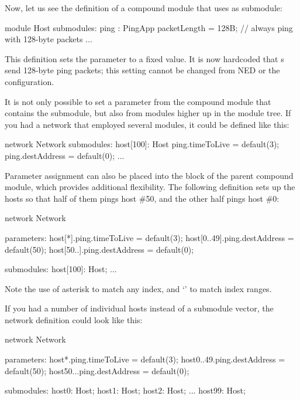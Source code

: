 Now, let us see the definition of a  compound module that uses
 as submodule:

\begin{ned}
module Host
{
    submodules:
        ping : PingApp {
            packetLength = 128B; // always ping with 128-byte packets
        }
        ...
}
\end{ned}

This definition sets the  parameter to a fixed value. It
is now hardcoded that s send 128-byte ping packets; this
setting cannot be changed from NED or the configuration.

It is not only possible to set a parameter from the compound module that
contains the submodule, but also from modules higher up in the module tree.
If you had a network that employed several  modules, it could be
defined like this:

\begin{ned}
network Network
{
    submodules:
        host[100]: Host {
            ping.timeToLive = default(3);
            ping.destAddress = default(0);
        }
        ...
}
\end{ned}

Parameter assignment can also be placed into the  block of
the parent compound module, which provides additional flexibility. The
following definition sets up the hosts so that half of them pings host \#50,
and the other half pings host \#0:

\begin{ned}
network Network
{
    parameters:
        host[*].ping.timeToLive = default(3);
        host[0..49].ping.destAddress = default(50);
        host[50..].ping.destAddress = default(0);

    submodules:
        host[100]: Host;
        ...
}
\end{ned}

Note the use of asterisk to match any index, and `' to match index ranges.

If you had a number of individual hosts instead of a submodule vector,
the network definition could look like this:

\begin{ned}
network Network
{
    parameters:
        host*.ping.timeToLive = default(3);
        host{0..49}.ping.destAddress = default(50);
        host{50..}.ping.destAddress = default(0);

    submodules:
        host0: Host;
        host1: Host;
        host2: Host;
        ...
        host99: Host;
}
\end{ned}

